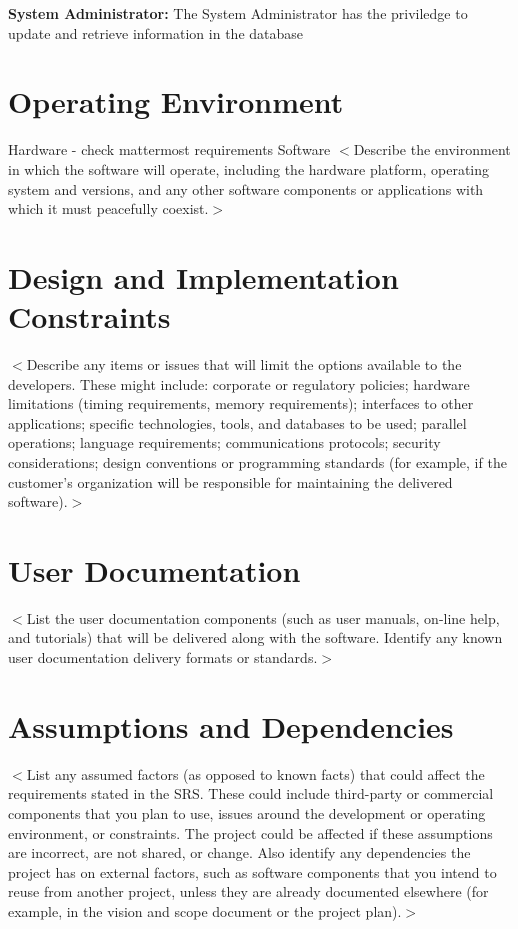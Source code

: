 \documentclass{scrreprt}
\newcommand\tab[1][0.5cm]{\hspace*{#1}}
\begin{document}
\textbf{System Administrator:}
\tab The System Administrator has the priviledge to update and retrieve
information in the database 


\section{Operating Environment}
Hardware - check mattermost requirements
Software
$<$Describe the environment in which the software will operate, including the
hardware platform, operating system and versions, and any other software
components or applications with which it must peacefully coexist.$>$

\section{Design and Implementation Constraints}
$<$Describe any items or issues that will limit the options available to the
developers. These might include: corporate or regulatory policies; hardware
limitations (timing requirements, memory requirements); interfaces to other
applications; specific technologies, tools, and databases to be used; parallel
operations; language requirements; communications protocols; security
considerations; design conventions or programming standards (for example, if the
customer’s organization will be responsible for maintaining the delivered
software).$>$

\section{User Documentation}
$<$List the user documentation components (such as user manuals, on-line help,
and tutorials) that will be delivered along with the software. Identify any
known user documentation delivery formats or standards.$>$
\section{Assumptions and Dependencies}

$<$List any assumed factors (as opposed to known facts) that could affect the
requirements stated in the SRS. These could include third-party or commercial
components that you plan to use, issues around the development or operating
environment, or constraints. The project could be affected if these assumptions
are incorrect, are not shared, or change. Also identify any dependencies the
project has on external factors, such as software components that you intend to
reuse from another project, unless they are already documented elsewhere (for
example, in the vision and scope document or the project plan).$>$
\end{document}
